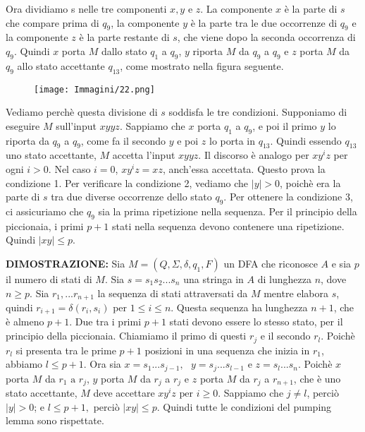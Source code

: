 \documentclass{article}
\begin{document}
Ora dividiamo s nelle tre componenti $x,y$ e $z$. La componente $x$ è la
parte di $s$ che compare prima di $q_{9}$, la componente $y$ è la parte tra le due
occorrenze di $q_{9}$ e la componente $z$ è la parte restante di $s$, che viene dopo
la seconda occorrenza di $q_{9}$. Quindi $x$ porta $M$ dallo stato $q_{1}$ a $q_{9}$, $y$ riporta
$M$ da $q_{9}$ a $q_{9}$ e $z$ porta $M$ da $q_{9}$ allo stato accettante $q_{13}$, come mostrato
nella figura seguente.

\begin{figure}[H]
    \centering
    \texttt{[image: Immagini/22.png]}
    \label{fig:your_image}
\end{figure}

Vediamo perchè questa divisione di $s$ soddisfa le tre condizioni. Supponiamo di eseguire $M$ sull'input $xyyz$. Sappiamo che $x$ porta $q_{1}$ a $q_{9}$, e poi il primo $y$ lo riporta da $q_{9}$ a $q_{9}$, come fa il secondo $y$ e poi $z$ lo porta in $q_{13}$. Quindi essendo $q_{13}$ uno stato accettante, $M$ accetta l'input $xyyz$. Il discorso è analogo per $xy^{i}z$ per ogni $i>0$. Nel caso $i = 0$, $xy^{i}z=xz$, anch'essa accettata. Questo prova la condizione 1.
Per verificare la condizione 2, vediamo che $|y| > 0$, poichè era la parte di $s$ tra due diverse occorrenze dello stato $q_{9}$.
Per ottenere la condizione 3, ci assicuriamo che $q_{9}$ sia la prima ripetizione nella sequenza. Per il principio della piccionaia, i primi $p+1$ stati nella sequenza devono contenere una ripetizione. Quindi $|xy| \leq p$.
\vspace{1em}

\textbf{DIMOSTRAZIONE:}
Sia $M = (Q,\Sigma,\delta,q_{1},F)$ un DFA che riconosce $A$ e sia $p$ il numero di stati di $M$.
Sia $s = s_{1}s_{2}...s_{n}$ una stringa in $A$ di lunghezza $n$, dove $n \geq p$. Sia $r_{1},...r_{n+1}$ la sequenza di stati attraversati da $M$ mentre elabora $s$, quindi $r_{i+1} = \delta(r_{i},s_{i})$ per $1 \leq i \leq n$. Questa sequenza ha lunghezza $n+1$, che è almeno $p+1$. Due tra i primi $p+1$ stati devono essere lo stesso stato, per il principio della piccionaia. Chiamiamo il primo di questi $r_{j}$ e il secondo $r_{l}$. Poichè $r_{l}$ si presenta tra le prime $p+1$ posizioni in una sequenza che inizia in $r_{1}$, abbiamo $l \leq p+1$. Ora sia $x = s_{1}...s_{j-1},\text{ }y = s_{j}...s_{l-1}$ e $z = s_{l}...s_{n}$. Poichè $x$ porta $M$ da $r_{1} \text{ a }r_{j}$, $y$ porta $M$ da $r_{j}$ a $r_{j}$ e $z$ porta $M$ da $r_{j}$ a $r_{n+1}$, che è uno stato accettante, $M$ deve accettare $xy^{i}z \text{ per }i \geq 0$. Sappiamo che $j\neq l$, perciò $|y| > 0$; e $l \leq p+1,$ perciò $|xy| \leq p$. Quindi tutte le condizioni del pumping lemma sono rispettate.
\vspace{3em}
\end{document}
